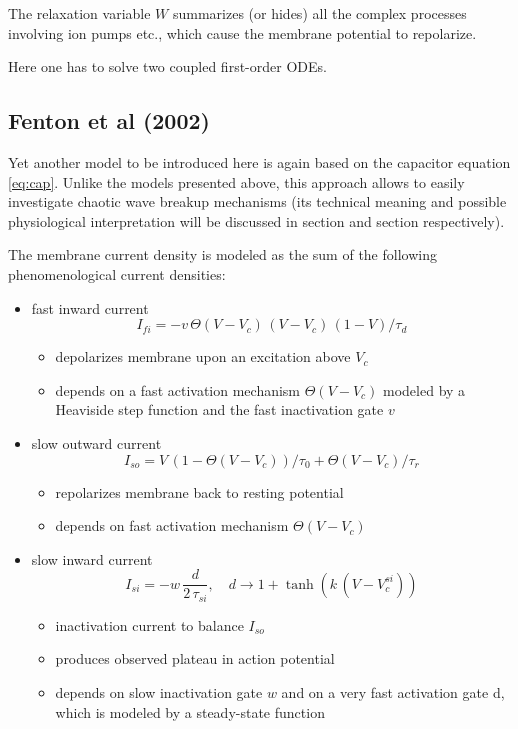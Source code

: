 The relaxation variable $W$ summarizes (or hides) all the complex processes
involving ion pumps etc., which cause the membrane potential to repolarize.

Here one has to solve two coupled first-order ODEs.

\subsection{Fenton et al (2002)}
Yet another model to be introduced here is again based on the capacitor
equation \eqref{eq:cap}. Unlike the models presented above, this approach
allows to easily investigate chaotic wave breakup mechanisms (its technical
meaning and possible physiological interpretation will be discussed in section
and section  respectively).

The membrane current density is modeled as the sum of the following
phenomenological current densities:
\begin{itemize}
    \item fast inward current
        \[I_{fi}=-v\,\Theta(V-V_c)\,(V-V_c)\,(1-V)/\tau_d\]
    \begin{itemize}
        \item depolarizes membrane upon an excitation above $V_c$
        \item depends on a fast activation mechanism $\Theta(V-V_c)$ modeled by
            a Heaviside step function and the fast inactivation gate $v$
    \end{itemize}

    \item slow outward current
        \[I_{so}=V\,(1-\Theta(V-V_c))/\tau_0+\Theta(V-V_c)/\tau_r\]
    \begin{itemize}
        \item repolarizes membrane back to resting potential
        \item depends on fast activation mechanism $\Theta(V-V_c)$
    \end{itemize}

    \item slow inward current
        \[I_{si}=-w\,\frac{d}{2\,\tau_{si}},\quad
            d\to 1+\tanh(k\,(V-V_{c}^{si}))\]
    \begin{itemize}
        \item inactivation current to balance $I_{so}$
        \item produces observed plateau in action potential
        \item depends on slow inactivation gate $w$ and on a very fast
            activation gate d, which is modeled by a steady-state
            function
    \end{itemize}
\end{itemize}

